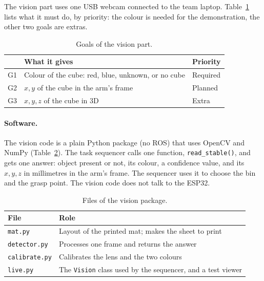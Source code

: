 
The vision part uses one USB webcam connected to the team laptop. Table~\ref{tab:cv-goals} lists what it must do, by
priority: the colour is needed for the demonstration, the other two goals are extras.

\begin{table}[h]
  \centering
  \caption{Goals of the vision part.}
  \label{tab:cv-goals}
  \begin{tabular}{@{}lll@{}}
    \toprule
    & What it gives & Priority \\ \midrule
    G1 & Colour of the cube: red, blue, unknown, or no cube & Required \\
    G2 & $x, y$ of the cube in the arm's frame & Planned \\
    G3 & $x, y, z$ of the cube in 3D & Extra \\ \bottomrule
  \end{tabular}
\end{table}

\paragraph{Software.} The vision code is a plain Python package (no ROS) that uses OpenCV and NumPy
(Table~\ref{tab:cv-modules}). The task sequencer calls one function, \texttt{read\_stable()}, and gets one answer: object
present or not, its colour, a confidence value, and its $x, y, z$ in millimetres in the arm's frame. The sequencer uses it to
choose the bin and the grasp point. The vision code does not talk to the ESP32.

\begin{table}[h]
  \centering
  \caption{Files of the vision package.}
  \label{tab:cv-modules}
  \begin{tabular}{@{}ll@{}}
    \toprule
    File & Role \\ \midrule
    \texttt{mat.py} & Layout of the printed mat; makes the sheet to print \\
    \texttt{detector.py} & Processes one frame and returns the answer \\
    \texttt{calibrate.py} & Calibrates the lens and the two colours \\
    \texttt{live.py} & The \texttt{Vision} class used by the sequencer, and a test viewer \\ \bottomrule
  \end{tabular}
\end{table}

